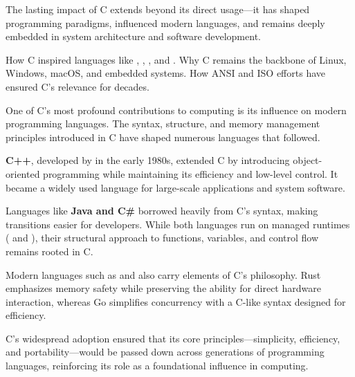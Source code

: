 \begin{NxSSSBox}
	\begin{NxIDBox}
		The lasting impact of C extends beyond its direct usage—it has shaped programming paradigms, influenced modern languages, and remains deeply embedded in system architecture and software development.
	\end{NxIDBox}
	\begin{NxIDBoxL}
		 How C inspired languages like , , , and .
		 Why C remains the backbone of Linux, Windows, macOS, and embedded systems.
		 How ANSI and ISO efforts have ensured C’s relevance for decades.
	\end{NxIDBoxL}
\end{NxSSSBox}

\begin{NxSSSSBox}
	\begin{NxIDBox}
		One of C’s most profound contributions to computing is its influence on modern programming languages. The syntax, structure, and memory management principles introduced in C have shaped numerous languages that followed.
	\end{NxIDBox}
	\begin{NxIDBox}
		\textbf{C++}, developed by  in the early 1980s, extended C by introducing object-oriented programming while maintaining its efficiency and low-level control. It became a widely used language for large-scale applications and system software.
	\end{NxIDBox}
	\begin{NxIDBox}
		Languages like \textbf{Java and C\#} borrowed heavily from C’s syntax, making transitions easier for developers. While both languages run on managed runtimes ( and ), their structural approach to functions, variables, and control flow remains rooted in C.
	\end{NxIDBox}
	\begin{NxIDBox}
	Modern languages such as  and  also carry elements of C’s philosophy. Rust emphasizes memory safety while preserving the ability for direct hardware interaction, whereas Go simplifies concurrency with a C-like syntax designed for efficiency.
	\end{NxIDBox}
	\begin{NxIDBox}
		C’s widespread adoption ensured that its core principles—simplicity, efficiency, and portability—would be passed down across generations of programming languages, reinforcing its role as a foundational influence in computing.
	\end{NxIDBox}
\end{NxSSSSBox}

